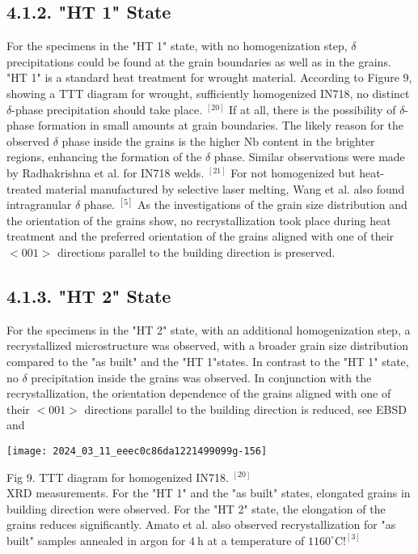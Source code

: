 \documentclass[10pt]{article}
\begin{document}
\subsection*{4.1.2. "HT 1" State}
For the specimens in the "HT 1" state, with no homogenization step, $\delta$ precipitations could be found at the grain boundaries as well as in the grains. "HT 1" is a standard heat treatment for wrought material. According to Figure 9, showing a TTT diagram for wrought, sufficiently homogenized IN718, no distinct $\delta$-phase precipitation should take place. ${ }^{[20]}$ If at all, there is the possibility of $\delta$-phase formation in small amounts at grain boundaries. The likely reason for the observed $\delta$ phase inside the grains is the higher $\mathrm{Nb}$ content in the brighter regions, enhancing the formation of the $\delta$ phase. Similar observations were made by Radhakrishna et al. for IN718 welds. ${ }^{[21]}$ For not homogenized but heat-treated material manufactured by selective laser melting, Wang et al. also found intragranular $\delta$ phase. ${ }^{[5]}$ As the investigations of the grain size distribution and the orientation of the grains show, no recrystallization took place during heat treatment and the preferred orientation of the grains aligned with one of their $<001>$ directions parallel to the building direction is preserved.

\subsection*{4.1.3. "HT 2" State}
For the specimens in the "HT 2" state, with an additional homogenization step, a recrystallized microstructure was observed, with a broader grain size distribution compared to the "as built" and the "HT 1"states. In contrast to the "HT 1" state, no $\delta$ precipitation inside the grains was observed. In conjunction with the recrystallization, the orientation dependence of the grains aligned with one of their $<001>$ directions parallel to the building direction is reduced, see EBSD and

\begin{center}
\texttt{[image: 2024\_03\_11\_eeec0c86da1221499099g-156]}
\end{center}

Fig 9. TTT diagram for homogenized IN718. ${ }^{[20]}$\\
XRD measurements. For the "HT 1" and the "as built" states, elongated grains in building direction were observed. For the "HT 2" state, the elongation of the grains reduces significantly. Amato et al. also observed recrystallization for "as built" samples annealed in argon for $4 \mathrm{~h}$ at a temperature of $1160^{\circ} \mathrm{C} !^{[3]}$
\end{document}

